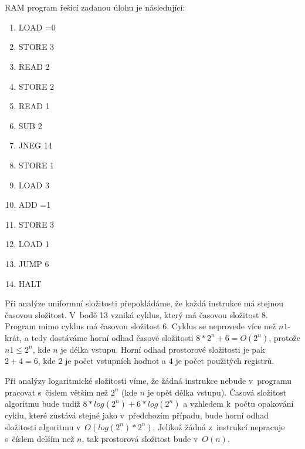 \documentclass[a4paper]{article}
\begin{document}
\section*{}
RAM program řešící zadanou úlohu je následující:
\begin{enumerate}
    \item LOAD =0
    \item STORE 3
    \item READ 2
    \item STORE 2
    \item READ 1
    \item SUB 2
    \item JNEG 14
    \item STORE 1
    \item LOAD 3
    \item ADD =1
    \item STORE 3
    \item LOAD 1
    \item JUMP 6
    \item HALT
\end{enumerate}

Při analýze uniformní složitosti přepokládáme, že každá instrukce má stejnou časovou složitost.
V~bodě 13 vzniká cyklus, který má časovou složitost $8$. Program mimo cyklus má časovou složitost $6$.
Cyklus se neprovede více než $n1$-krát, a tedy dostáváme horní odhad časové složitosti $8*2^n+6=O(2^{n})$,
protože $n1 \leq 2^n$, kde $n$ je délka vstupu.
Horní odhad prostorové složitosti je pak $2+4=6$, kde $2$ je počet vstupních hodnot a $4$ je počet použitých registrů. 

Při analýzy logaritmické složitosti víme, že žádná instrukce nebude v~programu pracovat s~číslem větším než $2^n$
(kde $n$ je opět délka vstupu).
Časová složitost algoritmu bude tudíž $8*log(2^n)+6*log(2^n)$ a vzhledem k~počtu opakování cyklu, které zůstává
stejné jako v~předchozím případu, bude horní odhad složitosti algoritmu v~$O(log(2^n)*2^n)$.
Jelikož žádná z~instrukcí nepracuje s~číslem delším než $n$, tak prostorová složitost bude v~$O(n)$.
\end{document}
